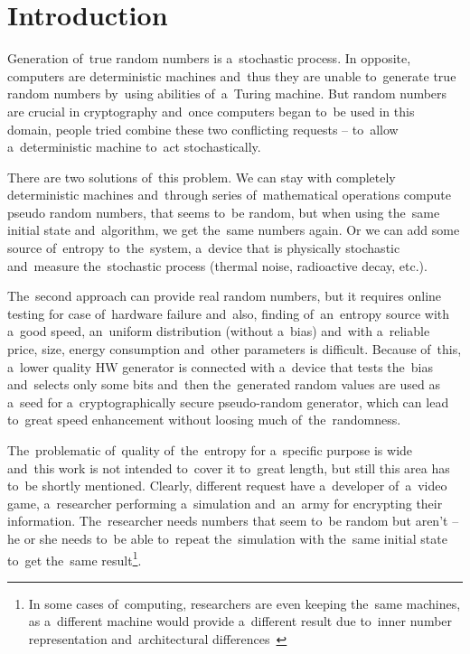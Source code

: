 \chapter{Introduction}
\par{
Generation of~true random numbers is a~stochastic process.
In opposite, computers are deterministic machines 
and~thus they are unable to~generate true random numbers by~using abilities 
of~a~Turing machine. 
But random numbers are crucial in cryptography and~once computers began 
to~be used in this domain, people tried combine these two conflicting requests 
-- to~allow a~deterministic machine to~act stochastically. 
}

\par{
There are two solutions of~this problem. We can stay with completely 
deterministic machines and~through series of~mathematical operations 
compute pseudo random numbers, that seems to~be random, 
but when using the~same initial state and~algorithm, we get the~same 
numbers again. Or we can add some source of~entropy to~the~system, 
a~device that is physically stochastic and~measure the~stochastic process 
(thermal noise, radioactive decay, etc.).
}

\par{
The~second approach can provide real random numbers, but it requires online 
testing for case of~hardware failure and~also, finding of~an~entropy source with
a~good speed, an~uniform distribution (without a~bias) and~with a~reliable price,
size, energy consumption and~other parameters is difficult. Because of~this, 
a~lower quality HW generator is connected with a~device that tests the~bias 
and~selects only some bits and~then the~generated random values are used 
as a~seed for a~cryptographically secure pseudo-random generator, 
which can lead to~great speed enhancement without loosing much 
of~the~randomness.
}

\par{
The~problematic of~quality of~the~entropy for a~specific purpose is wide 
and~this work is not intended to~cover it to~great length, but still this area 
has to~be shortly mentioned. Clearly, different request have a~developer 
of~a~video game, a~researcher performing a~simulation and~an~army 
for encrypting their information. 
The~researcher needs numbers that seem to~be random but aren't 
-- he or she needs to~be able to~repeat the~simulation with the~same initial state 
to~get the~same result\footnote{In some cases of~computing, 
researchers are even keeping the~same machines, as a~different machine 
would provide a~different result due to~inner number representation and~architectural differences~\cite{ArithmeticInCloud}}.
}


